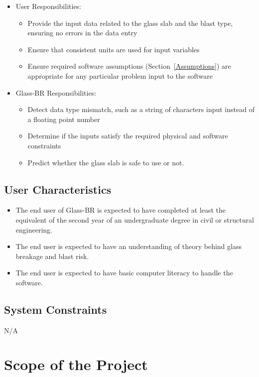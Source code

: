 \documentclass[12pt]{article}
\newcommand{\progname}{Glass-BR}
\begin{document}
\begin{itemize}
\item User Responsibilities:
  \begin{itemize}
  \item Provide the input data related to the glass slab and the blast type,
    ensuring no errors in the data entry
  \item Ensure that consistent units are used for input variables
  \item Ensure required software assumptions (Section~\ref{Assumptions}) are
    appropriate for any particular problem input to the software
  \end{itemize}
\item \progname{} Responsibilities:
  \begin{itemize}
  \item Detect data type mismatch, such as a string of characters input instead
    of a floating point number
  \item Determine if the inputs satisfy the required physical and software
    constraints
  \item Predict whether the glass slab is safe to use or not.
  \end{itemize}
\end{itemize}

\subsection{User Characteristics} 
\label{sec_userchar}
\begin{itemize}
\item The end user of \progname{} is expected to have completed at least the
  equivalent of the second year of an undergraduate degree in civil or
  structural engineering.
\item The end user is expected to have an understanding of theory behind glass
  breakage and blast risk.
\item The end user is expected to have basic computer literacy to handle the
  software.
\end{itemize}

\subsection{System Constraints}

N/A

\section{Scope of the Project}
\end{document}
